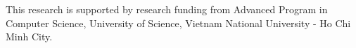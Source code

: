 





\appendix
%
\begin{acks}
This research is supported by research funding from Advanced Program in
Computer Science, University of Science, Vietnam National University - Ho Chi
Minh City.
\end{acks}

